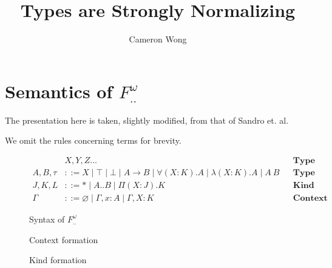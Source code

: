 \documentclass[a4paper, 10pt]{article}
\title{\Fwint Types are Strongly Normalizing}
\author{Cameron Wong}
\newcommand{\Fwint}{\ensuremath{F^\omega_{..}\ }}
\newcommand{\interval}[2]{#1 .. #2}
\newcommand{\isctx}[1]{#1\ \texttt{ctx}}
\newcommand{\iskd}[1]{#1\ \texttt{kd}}
\newcommand{\TyKd}{*}
\newcommand{\KDepArr}[3]{\Pi(#1:#2).#3}
\begin{document}
\maketitle

\section{Semantics of \Fwint}

The presentation here is taken, slightly modified, from that of Sandro et. al.

We omit the rules concerning terms for brevity.

\begin{figure}[h]
  \begin{align*}
          & X,Y,Z... && \textbf{Type Variable} \\
    A,B,\tau &::= X \mid \top \mid \bot \mid A \rightarrow B \mid
        \forall(X:K).A \mid \lambda(X:K).A \mid A\ B
      && \textbf{Type} \\
    J,K,L &::= \TyKd \mid \interval{A}{B} \mid \KDepArr{X}{J}{K}
      && \textbf{Kind} \\
    \Gamma &::= \varnothing \mid \Gamma, x:A \mid \Gamma, X:K
      && \textbf{Context}
  \end{align*}
  \caption{Syntax of \Fwint}
\end{figure}

\begin{figure}[ht]
  \caption{Context formation}
\end{figure}

\begin{figure}[ht]
  \caption{Kind formation}
\end{figure}
\end{document}
